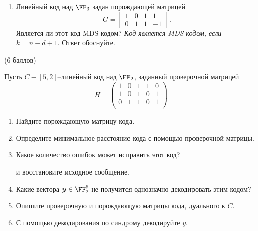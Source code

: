 \documentclass[12pt,a4paper]{scrartcl}
\newcounter{auf}
\newcommand{\auf}[2]
{
\stepcounter{auf}{\textbf{Задание} \textbf{\arabic{auf}} } ({#1} баллов) \vspace{3pt}

#2

\newpage %
}
\begin{document}
{\begin{enumerate}[1]
	\item Линейный код над $\FF_3$ задан порождающей матрицей
		\[
	G = \begin{bmatrix}
		1&0&1&1\\ 
		0&1&1&-1
	\end{bmatrix}.
	\]
	Является ли этот код MDS кодом? \textit{Код является MDS кодом, если $k = n-d+1$}. Ответ обоснуйте.
	
\end{enumerate}

}
\newpage


\auf{$6$}{%
	Пусть $C-[5,2]$--линейный код над $\FF_2$, заданный проверочной матрицей
	\[
	H = 
	\begin{pmatrix}
	1&0&1&1&0\\
	1&0&1&0&1\\
	0&1&1&0&1\\
	\end{pmatrix}
	\]  
	\begin{enumerate}
		\item Найдите порождающую матрицу кода.
		\item Определите минимальное расстояние кода с помощью проверочной матрицы.
		\item Какое количество ошибок может исправить этот код?
		
		и восстановите исходное сообщение.
		\item Какие вектора $y \in \FF_2^5$ не получится однозначно декодировать этим кодом?
		\item Опишите проверочную и порождающую матрицы кода, дуального к $C$.
		\item С помощью декодирования по синдрому декодируйте $y$.
	\end{enumerate}
\begin{center}



\end{center}}
\end{document}
